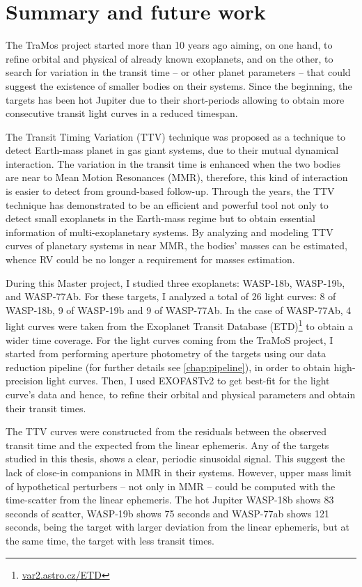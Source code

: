 \chapter{Summary and future work}\label{chap:conclusion}

The TraMos project started more than 10 years ago aiming, on one hand, to refine orbital and physical of already known exoplanets, and on the other, to search for variation in the transit time -- or other planet parameters -- that could suggest the existence of smaller bodies on their systems. Since the beginning, the targets has been hot Jupiter due to their short-periods allowing to obtain more consecutive transit light curves in a reduced timespan. 


The Transit Timing Variation (TTV) technique was proposed as a technique to detect Earth-mass planet in gas giant systems, due to their mutual dynamical interaction. The variation in the transit time is enhanced when the two bodies are near to Mean Motion Resonances (MMR), therefore, this kind of interaction is easier to detect from ground-based follow-up. Through the years, the TTV technique has demonstrated to be an efficient and powerful tool not only to detect small exoplanets in the Earth-mass regime but to obtain essential information of multi-exoplanetary systems. By analyzing and modeling TTV curves of planetary systems in near MMR, the bodies' masses can be estimated, whence RV could be no longer a requirement for masses estimation.

During this Master project, I studied three exoplanets: WASP-18b, WASP-19b, and WASP-77Ab. For these targets, I analyzed a total of 26 light curves: 8 of WASP-18b, 9 of WASP-19b and 9 of WASP-77Ab. In the case of WASP-77Ab, 4 light curves were taken from the Exoplanet Transit Database (ETD)\footnote{\url{var2.astro.cz/ETD}} to obtain a wider time coverage. For the light curves coming from the TraMoS project, I started from performing aperture photometry of the targets using our data reduction pipeline (for further details see \ref{chap:pipeline}), in order to obtain high-precision light curves. Then, I used EXOFASTv2 \cite{Eastman2013,Eastman2017} to get best-fit for the light curve's data and hence, to refine their orbital and physical parameters and obtain their transit times.

The TTV curves were constructed from the residuals between the observed transit time and the expected from the linear ephemeris. Any of the targets studied in this thesis, shows a clear, periodic sinusoidal signal. This suggest the lack of close-in companions in MMR in their systems. However, upper mass limit of hypothetical perturbers -- not only in MMR -- could be computed with the time-scatter from the linear ephemeris. The hot Jupiter WASP-18b shows 83 seconds of scatter, WASP-19b shows 75 seconds and WASP-77ab shows 121 seconds, being the target with larger deviation from the linear ephemeris, but at the same time, the target with less transit times.

